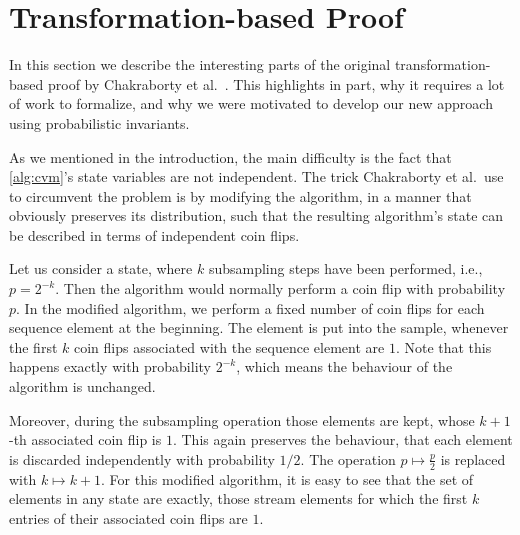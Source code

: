 \section{Transformation-based Proof}\label{sec:transformation_based_proof}
In this section we describe the interesting parts of the original transformation-based proof by Chakraborty et al.~\cite{chakraborty2022}.
This highlights in part, why it requires a lot of work to formalize, and why we were motivated to develop our new approach using probabilistic invariants.

As we mentioned in the introduction, the main difficulty is the fact that \cref{alg:cvm}'s state variables are not independent.
The trick Chakraborty et al.\ use to circumvent the problem is by modifying the algorithm, in a manner that obviously preserves its distribution, such that the resulting algorithm's state can be described in terms of independent coin flips.

Let us consider a state, where $k$ subsampling steps have been performed, i.e., $p = 2^{-k}$. 
Then the algorithm would normally perform a coin flip with probability $p$.
In the modified algorithm, we perform a fixed number of coin flips for each sequence element at the beginning.
The element is put into the sample, whenever the first $k$ coin flips associated with the sequence element are $1$.
Note that this happens exactly with probability $2^{-k}$, which means the behaviour of the algorithm is unchanged.

Moreover, during the subsampling operation those elements are kept, whose $k+1$-th associated coin flip is $1$.
This again preserves the behaviour, that each element is discarded independently with probability $1/2$.
The operation $p \mapsto \frac{p}{2}$ is replaced with $k \mapsto k+1$.
For this modified algorithm, it is easy to see that the set of elements in any state are exactly, those stream elements for which the first $k$ entries of their associated coin flips are $1$.

